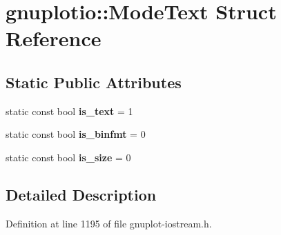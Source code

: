 \hypertarget{structgnuplotio_1_1_mode_text}{}\section{gnuplotio\+:\+:Mode\+Text Struct Reference}
\label{structgnuplotio_1_1_mode_text}
\subsection*{Static Public Attributes}
\begin{DoxyCompactItemize}
\item 
static const bool {\bfseries is\+\_\+text} = 1\hypertarget{structgnuplotio_1_1_mode_text_a7083d8977c354a036a7c542bf99d3d52}{}\label{structgnuplotio_1_1_mode_text_a7083d8977c354a036a7c542bf99d3d52}

\item 
static const bool {\bfseries is\+\_\+binfmt} = 0\hypertarget{structgnuplotio_1_1_mode_text_a4c771363d894ae64d6af961ffde35126}{}\label{structgnuplotio_1_1_mode_text_a4c771363d894ae64d6af961ffde35126}

\item 
static const bool {\bfseries is\+\_\+size} = 0\hypertarget{structgnuplotio_1_1_mode_text_aaffc1e7bb26c6d1404cb5a3f03f13be9}{}\label{structgnuplotio_1_1_mode_text_aaffc1e7bb26c6d1404cb5a3f03f13be9}

\end{DoxyCompactItemize}


\subsection{Detailed Description}


Definition at line 1195 of file gnuplot-\/iostream.\+h.

